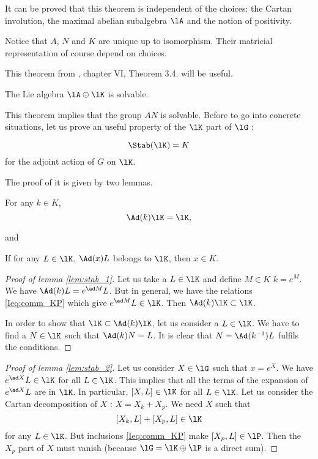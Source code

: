 \begin{remark}
It can be proved that this theorem is independent of the choices: the Cartan involution, the maximal abelian subalgebra $\lA$ and the notion of positivity.
\end{remark} 
Notice that $A$, $N$ and $K$ are unique up to isomorphism. Their matricial representation of course depend on choices.

This theorem from \cite{Helgason}, chapter VI, Theorem 3.4. will be useful.

\begin{theorem}
The Lie algebra $\lA\oplus\lK$ is solvable.
\end{theorem}
This theorem implies that the group $AN$ is solvable. Before to go into concrete situations, let us prove an useful property of the $\lK$ part of $\lG$ :

\begin{theorem}
\[
      \Stab(\lK)=K
\]
 for the adjoint action of $G$ on $\lK$.
\label{tho:Stab_K}
\end{theorem}
The proof of it is given by two lemmas. \cite{Humphreys}

\begin{lemma}
For any $k\in K$,
\[
   \Ad(k)\lK=\lK,
\]
\label{lem:stab_1}
\end{lemma}
and
\begin{lemma}
 If for any $L\in\lK$, $\Ad(x)L$ belongs to $\lK$, then $x\in K$.
\label{lem:stab_2}
\end{lemma}

\begin{proof}[Proof of lemma \ref{lem:stab_1}]
   Let us take a $L\in\lK$ and define $M\in K$ $k=e^M$. We have $\Ad(k)L=e^{\ad M}L$. But in general, we have the relations \eqref{Ieq:comm_KP} which give $e^{\ad M}L\in\lK$. Then $\Ad(k)\lK\subset\lK$.

   In order to show that $\lK\subset\Ad(k)\lK$, let us consider a $L\in\lK$. We have to find a $N\in\lK$ such that $\Ad(k)N=L$. It is clear that $N=\Ad(k^{-1})L$ fulfils the conditions.
\end{proof}

\begin{proof}[Proof of lemma \ref{lem:stab_2}]
Let us consider $X\in\lG$ such that $x=e^X$. We have $e^{\ad X}L\in\lK$ for all $L\in\lK$. This implies that all the terms of the expansion of $e^{\ad X}L$ are in $\lK$. In particular, $[X,L]\in\lK$ for all $L\in\lK$. Let us consider the Cartan decomposition of $X$ : $X=X_k+X_p$. We need $X$ such that
\[
   [X_k,L]+[X_p,L]\in\lK
\]
for any $L\in\lK$. But inclusions \eqref{Ieq:comm_KP} make $[X_p,L]\in\lP$. Then the $X_p$ part of $X$ must vanish (because $\lG=\lK\oplus\lP$ is a direct sum).
\end{proof}

